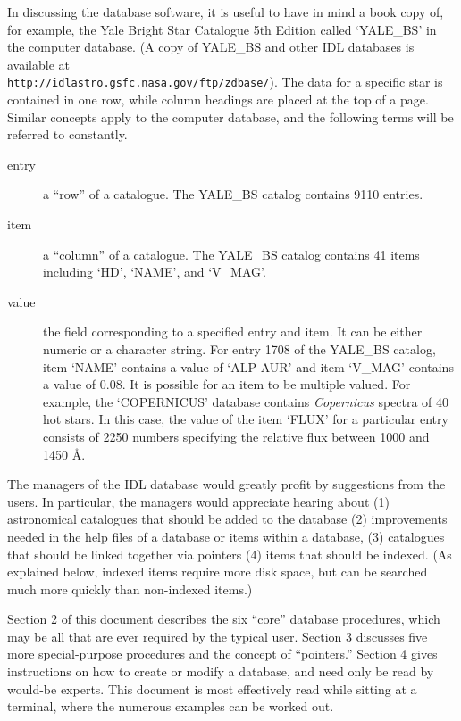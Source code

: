 In discussing the database software, it is useful to have in mind a
book copy of, for example, the Yale Bright Star Catalogue 5th Edition 
called `YALE\_BS' in the computer database.  (A copy of YALE\_BS and other 
IDL databases is available at \\
{\tt http://idlastro.gsfc.nasa.gov/ftp/zdbase/}).  The data for a specific star
is contained in one row, while column headings are placed at the top of
a page.  Similar concepts apply to the computer database, and the following
terms will be referred to constantly.
\begin{description}
\item[entry]  a ``row'' of a catalogue.  The
YALE\_BS catalog contains 9110 entries.
\item[item]   a ``column'' of a catalogue.
The YALE\_BS catalog contains 41 items including `HD', `NAME', and
`V\_MAG'.  
\item[value]  the field corresponding to a specified entry and item. 
It can be either numeric or a character string.
For entry 1708 of the YALE\_BS catalog, item `NAME' contains
a value of `ALP AUR' and item `V\_MAG' contains a value of 0.08.
It is possible for an item to be multiple valued.  For example, the
`COPERNICUS'  database contains {\em Copernicus} spectra of 40 hot stars.
In this case, the value of the item `FLUX' for a particular entry
consists of 2250 numbers specifying the relative flux between 1000 and
1450 \AA.
\end{description}

The managers of the IDL database would greatly profit by suggestions from 
the users.  In particular, the managers would appreciate hearing about 
(1) astronomical
catalogues that should be added to the database  (2) improvements needed in the
help files of a database or items within a database, (3) catalogues that 
should be linked together via pointers (4) items that should
be indexed.  (As explained below, indexed items require more disk space, but
can be searched much more quickly than non-indexed items.)

Section 2 of this document describes the six ``core'' database procedures,
which may be all that are ever required by the typical user.  Section 3
discusses five more special-purpose procedures and the concept of
``pointers.''   Section 4 gives instructions on how to create or modify
a database, and need only be read by would-be experts.  
This document is most effectively read 
while sitting at a terminal, where the numerous examples can be worked out.

